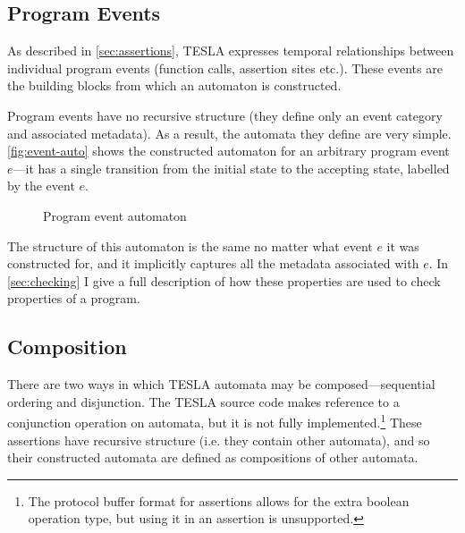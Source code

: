 \subsection{Program Events}

As described in \autoref{sec:assertions}, TESLA expresses temporal relationships
between individual program events (function calls, assertion sites
etc.). These events are the building blocks from which an automaton is
constructed.

Program events have no recursive structure (they define only an event
category and associated metadata). As a result, the automata they define
are very simple.  \autoref{fig:event-auto} shows the constructed
automaton for an arbitrary program event $e$---it has a single
transition from the initial state to the accepting state, labelled by
the event $e$.

\begin{figure}
  \centering
  \caption{Program event automaton}
  \label{fig:event-auto}
\end{figure}

The structure of this automaton is the same no matter what event $e$ it
was constructed for, and it implicitly captures all the metadata
associated with $e$. In \autoref{sec:checking} I give a full description
of how these properties are used to check properties of a program.

\subsection{Composition}

There are two ways in which TESLA automata may be composed---sequential
ordering and disjunction. The TESLA source code makes reference to a
conjunction operation on automata, but it is not fully
implemented.\footnote{The protocol buffer format for assertions allows
for the extra boolean operation type, but using it in an assertion is
unsupported.} These assertions have recursive structure (i.e.  they
contain other automata), and so their constructed automata are defined
as compositions of other automata.

